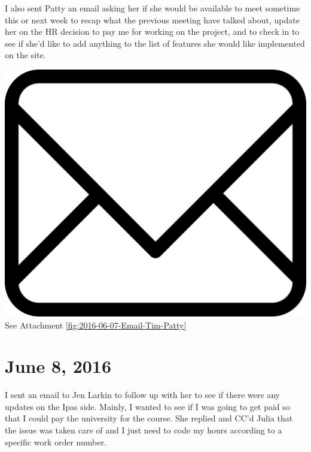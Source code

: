 \documentclass{article}
\begin{document}
I also sent Patty an email asking her if she would be available to meet sometime this or next week to recap what the previous meeting have talked about, update her on the HR decision to pay me for working on the project, and to check in to see if she'd like to add anything to the list of features she would like implemented on the site. 

\vspace{2em}
\noindent\includegraphics[height=\fontcharht\font`\B]{icons/attachment-email} See Attachment \ref{fig:2016-06-07-Email-Tim-Patty}
\vspace{2em}

\section{June 8, 2016}
I sent an email to Jen Larkin to follow up with her to see if there were any updates on the Ipas side. Mainly, I wanted to see if I was going to get paid so that I could pay the university for the course. She replied and CC'd Julia that the issue was taken care of and I just need to code my hours according to a specific work order number. 
\end{document}
